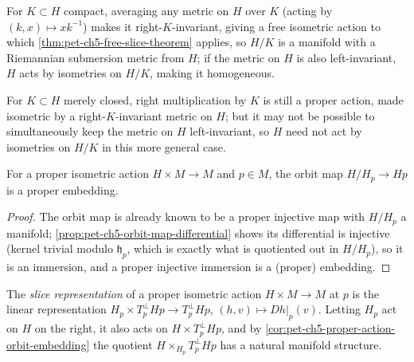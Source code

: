 \begin{remark}
  \label{rem:pet-ch5-quotient-homogeneous}
  For $K\subset H$ compact, averaging any metric on $H$ over $K$ (acting by
  $(k,x)\mapsto xk^{-1}$) makes it right-$K$-invariant, giving a free isometric
  action to which \cref{thm:pet-ch5-free-slice-theorem} applies, so $H/K$ is a
  manifold with a Riemannian submersion metric from $H$; if the metric on $H$ is
  also left-invariant, $H$ acts by isometries on $H/K$, making it homogeneous.
\end{remark}

\begin{remark}
  \label{rem:pet-ch5-closed-subgroup-quotient}
  For $K\subset H$ merely closed, right multiplication by $K$ is still a proper
  action, made isometric by a right-$K$-invariant metric on $H$; but it may not be
  possible to simultaneously keep the metric on $H$ left-invariant, so $H$ need not
  act by isometries on $H/K$ in this more general case.
\end{remark}

\begin{corollary}
  \label{cor:pet-ch5-proper-action-orbit-embedding}
  For a proper isometric action $H\times M\to M$ and $p\in M$, the orbit map
  $H/H_p\to Hp$ is a proper embedding.
\end{corollary}
\begin{proof}
  The orbit map is already known to be a proper injective map with $H/H_p$ a
  manifold; \cref{prop:pet-ch5-orbit-map-differential} shows its differential is
  injective (kernel trivial modulo $\mathfrak h_p$, which is exactly what is
  quotiented out in $H/H_p$), so it is an immersion, and a proper injective
  immersion is a (proper) embedding.
\end{proof}

\begin{definition}
  \label{def:pet-ch5-slice-representation}
  The \emph{slice representation} of a proper isometric action $H\times M\to M$ at
  $p$ is the linear representation $H_p\times T_p^\perp Hp\to T_p^\perp Hp$,
  $(h,v)\mapsto Dh|_p(v)$. Letting $H_p$ act on $H$ on the right, it also acts on
  $H\times T_p^\perp Hp$, and by \cref{cor:pet-ch5-proper-action-orbit-embedding}
  the quotient $H\times_{H_p}T_p^\perp Hp$ has a natural manifold structure.
\end{definition}

